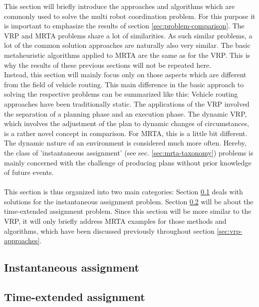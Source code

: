 This section will briefly introduce the approaches and algorithms which are commonly used to solve the multi robot coordination problem. For this purpose it is important to emphasize the results of section \ref{sec:problem-comparison}. The VRP and MRTA problems share a lot of similarities. As such similar problems, a lot of the common solution approaches are naturally also very similar. The basic metaheuristic algorithms applied to MRTA are the same as for the VRP. This is why the results of these previous sections will not be repeated here.\\
Instead, this section will mainly focus only on those aspects which are different from the field of vehicle routing. This main difference in the basic approach to solving the respective problems can be summarized like this: Vehicle routing approaches have been traditionally static. The applications of the VRP involved the separation of a planning phase and an execution phase. The dynamic VRP, which involves the adjustment of the plan to dynamic changes of circumstances, is a rather novel concept in comparison. For MRTA, this is a little bit different. The dynamic nature of an environment is considered much more often. Hereby, the class of 'instantaneous assignment' (see sec. \ref{sec:mrta-taxonomy}) problems is mainly concerned with the challenge of producing plans without prior knowledge of future events.\\ \\
This section is thus organized into two main categories: Section \ref{sec:instant-assign} deals with solutions for the instantaneous assignment problem. Section \ref{sec:extended-assign} will be about the time-extended assignment problem. Since this section will be more similar to the VRP, it will only briefly address MRTA examples for those methods and algorithms, which have been discussed previously throughout section \ref{sec:vrp-approaches}.

\subsection{Instantaneous assignment}\label{sec:instant-assign}


\subsection{Time-extended assignment}\label{sec:extended-assign}

